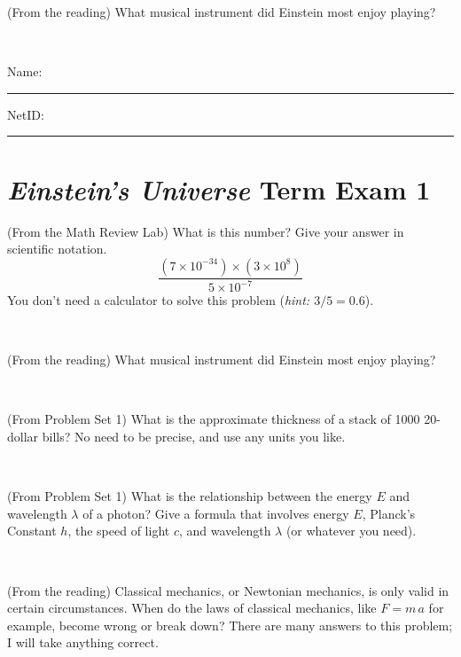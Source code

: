\documentclass[12pt, letterpaper]{article}
\begin{document}
\begin{problem} (From the reading)
What musical instrument did Einstein most enjoy playing?
\end{problem}


\vfill ~


\cleardoublepage



\noindent
Name: \rule[-1ex]{0.60\textwidth}{0.1pt}
NetID: \rule[-1ex]{0.20\textwidth}{0.1pt}

\section*{\textsl{Einstein's Universe} Term Exam 1}
\setcounter{problem}{1}


\begin{problem} (From the Math Review Lab)
What is this number? Give your answer in scientific notation.
$$
\frac{(7\times10^{-34})\times(3\times10^8)}{5\times10^{-7}}
$$
You don't need a calculator to solve this problem (\textit{hint: $3/5=0.6$}).
\end{problem}


\vfill ~

\begin{problem} (From the reading)
What musical instrument did Einstein most enjoy playing?
\end{problem}


\vfill ~

\begin{problem} (From Problem Set 1)
What is the approximate thickness of a stack of 1000 20-dollar bills?
No need to be precise, and use any units you like.
\end{problem}


\vfill ~

\begin{problem} (From Problem Set 1)
What is the relationship between the energy $E$ and wavelength
$\lambda$ of a photon? Give a formula that involves energy $E$,
Planck's Constant $h$, the speed of light $c$, and wavelength
$\lambda$ (or whatever you need).
\end{problem}

\vfill ~


\clearpage


\begin{problem} (From the reading)
Classical mechanics, or Newtonian mechanics, is only valid in certain
circumstances. When do the laws of classical mechanics, like $F =
m\,a$ for example, become wrong or break down? There are many answers
to this problem; I will take anything correct.
\end{problem}
\end{document}
